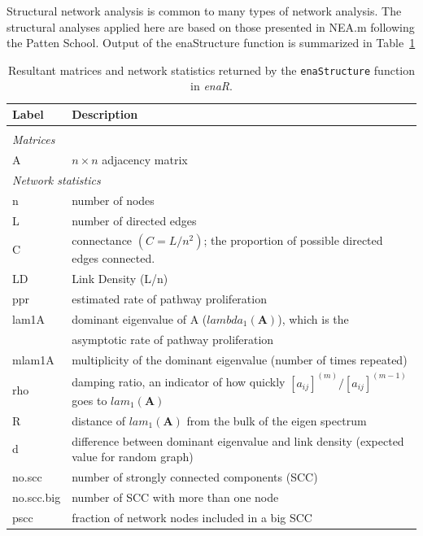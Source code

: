 \documentclass[article]{jss}
\begin{document}
Structural network analysis is common to many types of network
analysis.  The structural analyses applied here are based on those
presented in NEA.m \citep{fath06} following the Patten School.  Output
of the enaStructure function is summarized in Table~\ref{tab:structure}

\begin{table}[h]
  \caption{Resultant matrices and network statistics returned by the
    \texttt{enaStructure} function in \textit{enaR}.}\label{tab:structure}
\center
\begin{small}
  \begin{tabularx}{\textwidth}{l l}
    \textbf{Label} & \textbf{Description} \\ \hline \\[-2ex]
    \multicolumn{2}{l}{\textit{Matrices}} \\
    A & $n \times n$ adjacency matrix\\  [1ex]
    \multicolumn{2}{l}{\textit{Network statistics}} \\
    n & number of nodes \\
    L & number of directed edges \\
    C & connectance $(C = L/n^2)$; the proportion of possible directed
    edges connected.\\
    LD & Link Density (L/n) \\
    ppr & estimated rate of pathway proliferation \citep{borrett03} \\
    lam1A & dominant eigenvalue of A ($lambda_1(\mathbf{A})$), which is the \\
    & asymptotic rate of pathway proliferation \citep{borrett07_jtb}\\
    mlam1A & multiplicity of the dominant eigenvalue (number of
    times repeated) \\
    rho & damping ratio, an indicator of how quickly
    $[a_{ij}]^{(m)}/[a_{ij}]^{(m-1)}$ goes to $lam_1(\mathbf{A})$ \citep[][, p. 95]{caswell01} \\
    R & distance of $lam_1(\mathbf{A})$ from the bulk of the eigen spectrum \citep{farkas2001spectra}\\
    d & difference between dominant eigenvalue and link density
    (expected value for random graph) \\
    no.scc & number of strongly connected components (SCC) \\
    no.scc.big & number of SCC with more than one node \\
    pscc & fraction of network nodes included in a big SCC\\
    \hline
  \end{tabularx}
\end{small}
\end{table}
\end{document}
